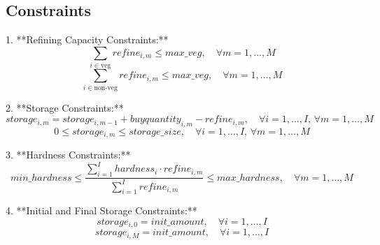 \documentclass{article}
\begin{document}
\subsection*{Constraints}

1. **Refining Capacity Constraints:**
   \[
   \sum_{i \in \text{veg}} refine_{i,m} \leq max\_veg, \quad \forall m = 1,\ldots,M
   \]
   \[
   \sum_{i \in \text{non-veg}} refine_{i,m} \leq max\_veg, \quad \forall m = 1,\ldots,M
   \]

2. **Storage Constraints:**
   \[
   storage_{i,m} = storage_{i,m-1} + buyquantity_{i,m} - refine_{i,m}, \quad \forall i = 1,\ldots,I, \, \forall m = 1,\ldots,M
   \]
   \[
   0 \leq storage_{i,m} \leq storage\_size, \quad \forall i = 1,\ldots,I, \, \forall m = 1,\ldots,M
   \]

3. **Hardness Constraints:**
   \[
   min\_hardness \leq \frac{\sum_{i=1}^{I} hardness_{i} \cdot refine_{i,m}}{\sum_{i=1}^{I} refine_{i,m}} \leq max\_hardness, \quad \forall m = 1,\ldots,M
   \]

4. **Initial and Final Storage Constraints:**
   \[
   storage_{i,0} = init\_amount, \quad \forall i = 1,\ldots,I
   \]
   \[
   storage_{i,M} = init\_amount, \quad \forall i = 1,\ldots,I
   \]
\end{document}
